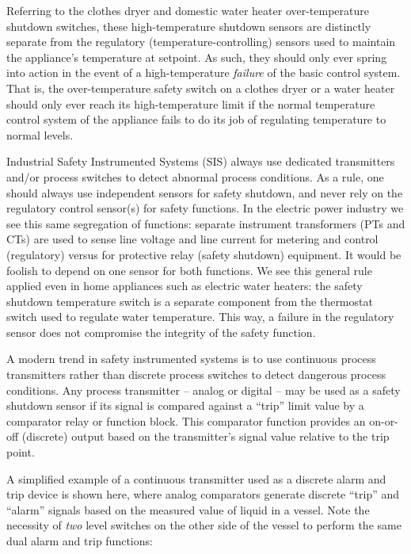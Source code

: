 Referring to the clothes dryer and domestic water heater over-temperature shutdown switches, these high-temperature shutdown sensors are distinctly separate from the regulatory (temperature-controlling) sensors used to maintain the appliance's temperature at setpoint.  As such, they should only ever spring into action in the event of a high-temperature \textit{failure} of the basic control system.  That is, the over-temperature safety switch on a clothes dryer or a water heater should only ever reach its high-temperature limit if the normal temperature control system of the appliance fails to do its job of regulating temperature to normal levels.

Industrial Safety Instrumented Systems (SIS) always use dedicated transmitters and/or process switches to detect abnormal process conditions.  As a rule, one should always use independent sensors for safety shutdown, and never rely on the regulatory control sensor(s) for safety functions.  In the electric power industry we see this same segregation of functions: separate instrument transformers (PTs and CTs) are used to sense line voltage and line current for metering and control (regulatory) versus for protective relay (safety shutdown) equipment.  It would be foolish to depend on one sensor for both functions.  We see this general rule applied even in home appliances such as electric water heaters: the safety shutdown temperature switch is a separate component from the thermostat switch used to regulate water temperature.  This way, a failure in the regulatory sensor does not compromise the integrity of the safety function.

\vskip 10pt

A modern trend in safety instrumented systems is to use continuous process transmitters rather than discrete process switches to detect dangerous process conditions.  Any process transmitter -- analog or digital -- may be used as a safety shutdown sensor if its signal is compared against a ``trip'' limit value by a comparator relay or function block.  This comparator function provides an on-or-off (discrete) output based on the transmitter's signal value relative to the trip point.  

\filbreak

A simplified example of a continuous transmitter used as a discrete alarm and trip device is shown here, where analog comparators generate discrete ``trip'' and ``alarm'' signals based on the measured value of liquid in a vessel.  Note the necessity of \textit{two} level switches on the other side of the vessel to perform the same dual alarm and trip functions:

